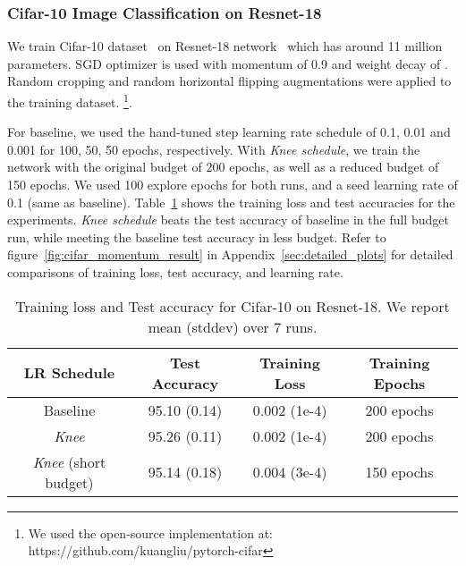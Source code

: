 \documentclass[twoside,11pt]{article}
\newcommand{\lrschedule}{\textit{Knee schedule}}
\newcommand{\lrscheduleshort}{\textit{Knee}}
\begin{document}
\subsubsection{Cifar-10 Image Classification on Resnet-18}

We train Cifar-10 dataset~\citep{cifar-10-dataset} on Resnet-18 network~\citep{resnet_he_2016} which has around 11 million parameters. SGD optimizer is used with momentum of 0.9 and weight decay of . Random cropping and random horizontal flipping augmentations were applied to the training dataset. \footnote{We used the open-source implementation at: https://github.com/kuangliu/pytorch-cifar}. 

For baseline, we used the hand-tuned step learning rate schedule of 0.1, 0.01 and 0.001 for 100, 50, 50 epochs, respectively. With \lrschedule{}, we train the network with the original budget of 200 epochs, as well as a reduced budget of 150 epochs. We used 100 explore epochs for both runs, and a seed learning rate of 0.1 (same as baseline).
Table~\ref{tab:cifar_results_train_loss_test_acc} shows the training loss and test accuracies for the experiments. \lrschedule{} beats the test accuracy of baseline in the full budget run, while meeting the baseline test accuracy in  less budget. Refer to figure~\ref{fig:cifar_momentum_result} in Appendix~\ref{sec:detailed_plots} for detailed comparisons of training loss, test accuracy, and learning rate.

\begin{table}[h]
    \small
\centering
\caption{Training loss and Test accuracy for Cifar-10 on Resnet-18. We report mean (stddev) over 7 runs.} 
\label{tab:cifar_results_train_loss_test_acc}
\begin{tabular}{cccc}
\toprule
\multirow{1}{*}{LR Schedule} & Test Accuracy & Training Loss & Training Epochs \\
\midrule
  Baseline   & \multirow{1}{*}{95.10 (0.14)}  & \multirow{1}{*}{0.002 (1e-4)}  & 200 epochs \\ 

  \lrscheduleshort{}     & \multirow{1}{*}{95.26 (0.11)} &  \multirow{1}{*}{0.002 (1e-4)} & 200 epochs \\
   
  
  \lrscheduleshort{} (short budget)     & \multirow{1}{*}{95.14 (0.18)} &  \multirow{1}{*}{0.004 (3e-4)}  & 150 epochs \\  
\bottomrule
\end{tabular}
\end{table}
\end{document}

